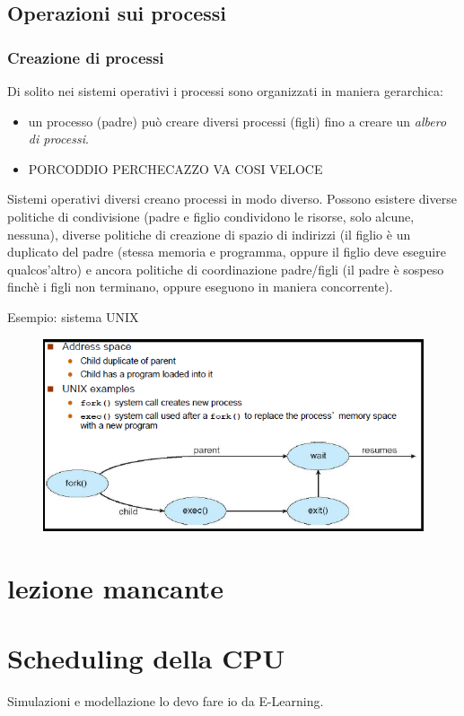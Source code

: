 \documentclass[11pt]{article}
\begin{document}
\subsection{Operazioni sui processi}
\subsubsection{Creazione di processi}
Di solito nei sistemi operativi i processi sono organizzati in maniera gerarchica:
\begin{itemize}
\item un processo (padre) può creare diversi processi (figli) fino a creare un \textit{albero di processi}.
\item PORCODDIO PERCHECAZZO VA COSI VELOCE
\end{itemize}
Sistemi operativi diversi creano processi in modo diverso. Possono esistere diverse politiche di condivisione (padre e figlio condividono le risorse, solo alcune, nessuna), diverse politiche di creazione di spazio di indirizzi (il figlio è un duplicato del padre (stessa memoria e programma, oppure il figlio deve eseguire qualcos'altro) e ancora politiche di coordinazione padre/figli (il padre è sospeso finchè i figli non terminano, oppure eseguono in maniera concorrente).

Esempio: sistema UNIX
\begin{figure}[H]
\includegraphics[scale=0.8]{UNIX-process.png}
\end{figure}

\section{lezione mancante}

\section{Scheduling della CPU}
Simulazioni e modellazione lo devo fare io da E-Learning.
\end{document}
